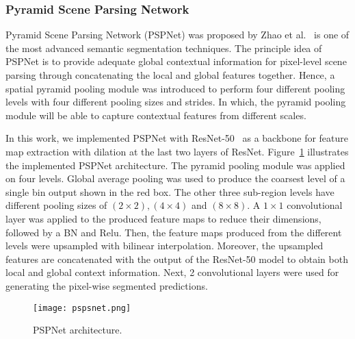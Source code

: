 \subsubsection{Pyramid Scene Parsing Network}
Pyramid Scene Parsing Network (PSPNet) was proposed by Zhao et al.~\cite{zhao2017pyramid} is one of the most advanced semantic segmentation techniques. 
The principle idea of PSPNet is to provide adequate global contextual information for pixel-level scene parsing through concatenating the local and global features together. 
Hence, a spatial pyramid pooling module was introduced to perform four different pooling levels with four different pooling sizes and strides.
In which, the pyramid pooling module will be able to capture contextual features from different scales.

In this work, we implemented PSPNet with ResNet-50~\cite{He2016} as a backbone for feature map extraction with dilation at the last two layers of ResNet. 
Figure~\ref{fig:PSPNet} illustrates the implemented PSPNet architecture.
The pyramid pooling module was applied on four levels.
Global average pooling was used to produce the coarsest level of a single bin output shown in the red box. 
The other three sub-region levels have different pooling sizes of \((2\times 2), (4\times 4)\) and \((8\times8)\).
A \(1 \times 1\) convolutional layer was applied to the produced feature maps to reduce their dimensions, followed by a BN and Relu.
Then, the feature maps produced from the different levels were upsampled with bilinear interpolation.
Moreover, the upsampled features are concatenated with the output of the ResNet-50 model to obtain both local and global context information. 
Next, 2 convolutional layers were used for generating the pixel-wise segmented predictions. 
\begin{figure} [h!]
	\centering
	\texttt{[image: pspsnet.png]}
	\caption{PSPNet architecture.} 
	\label{fig:PSPNet}
\end{figure} 
